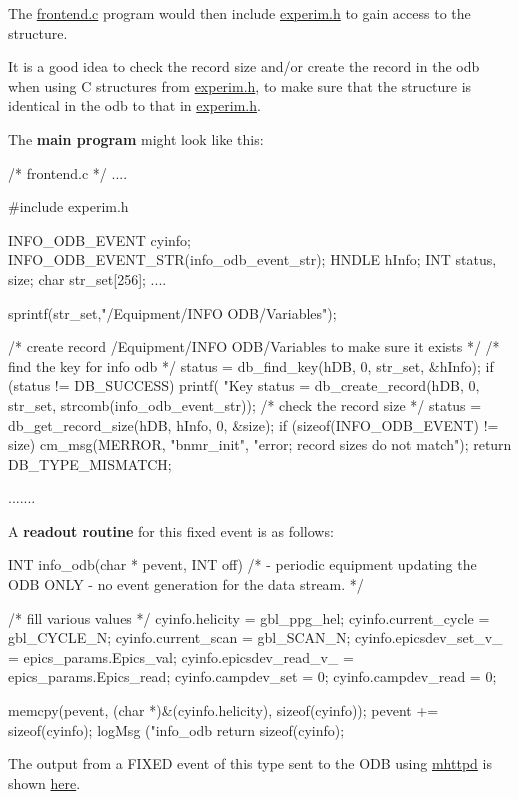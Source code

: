 The \hyperlink{frontend_8c}{frontend.c} program would then include \hyperlink{experim_8h}{experim.h} to gain access to the structure. \par
It is a good idea to check the record size and/or create the record in the odb when using C structures from \hyperlink{experim_8h}{experim.h}, to make sure that the structure is identical in the odb to that in \hyperlink{experim_8h}{experim.h}. \par
 The {\bfseries  main program } might look like this:


\begin{DoxyCode}
/* frontend.c */
....

#include experim.h

INFO_ODB_EVENT cyinfo;
INFO_ODB_EVENT_STR(info_odb_event_str);
HNDLE hInfo;
INT status, size;
char   str_set[256];
....

sprintf(str_set,"/Equipment/INFO ODB/Variables");

/* create record /Equipment/INFO ODB/Variables to make sure it exists  */
 /* find the key for info odb */
  status = db_find_key(hDB, 0, str_set, &hInfo);
  if (status != DB_SUCCESS)
    {
      printf( "Key %
      status = db_create_record(hDB, 0, str_set, strcomb(info_odb_event_str));
    }
  /* check the record size */
  status = db_get_record_size(hDB, hInfo, 0, &size);
  if (sizeof(INFO_ODB_EVENT) != size)
     {
        cm_msg(MERROR, "bnmr_init", "error; record sizes do not match");
        return DB_TYPE_MISMATCH;
     }

  .......    
\end{DoxyCode}


A {\bfseries readout routine} for this fixed event is as follows: 
\begin{DoxyCode}
INT info_odb(char * pevent, INT off)
/* - periodic equipment updating the ODB ONLY
   - no event generation for the data stream.
*/
{

  /* fill various values */
  cyinfo.helicity = gbl_ppg_hel;
  cyinfo.current_cycle = gbl_CYCLE_N;
  cyinfo.current_scan = gbl_SCAN_N;
  cyinfo.epicsdev_set_v_ = epics_params.Epics_val;
  cyinfo.epicsdev_read_v_ = epics_params.Epics_read;
  cyinfo.campdev_set = 0;   
  cyinfo.campdev_read = 0; 
    

  memcpy(pevent, (char *)&(cyinfo.helicity), sizeof(cyinfo));
  pevent += sizeof(cyinfo);
  logMsg ("info_odb %
  return sizeof(cyinfo);
}
\end{DoxyCode}
 \par
 The output from a FIXED event of this type sent to the ODB using \hyperlink{RC_mhttpd_utility}{mhttpd} is shown \hyperlink{RC_mhttpd_status_page_features_RC_mhttpd_eq_variables}{here}.

